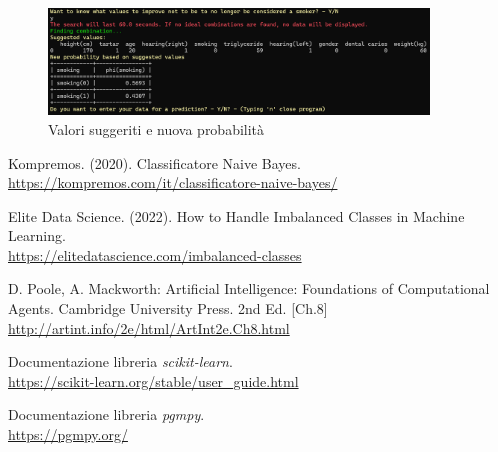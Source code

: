 \documentclass{article}
\begin{document}
\begin{figure}[H]
        \includegraphics[width=0.9\textwidth]{search}
        \centering
        \caption{Valori suggeriti e nuova probabilità}
        \centering
\end{figure}

\newpage
\begin{thebibliography}{5}
        Kompremos. (2020). Classificatore Naive Bayes. 
        \\\url{https://kompremos.com/it/classificatore-naive-bayes/} 
        
        Elite Data Science. (2022). How to Handle Imbalanced Classes in Machine Learning. 
        \\\url{https://elitedatascience.com/imbalanced-classes} 
        
        D. Poole, A. Mackworth: Artificial Intelligence: Foundations of Computational
        Agents. Cambridge University Press. 2nd Ed. [Ch.8]
        \\\url{http://artint.info/2e/html/ArtInt2e.Ch8.html} 
        
        Documentazione libreria \textit{scikit-learn}.
        \\\url{https://scikit-learn.org/stable/user_guide.html} 
        
        Documentazione libreria \textit{pgmpy}.
        \\\url{https://pgmpy.org/} 
        
        
        \end{thebibliography}
\end{document}
